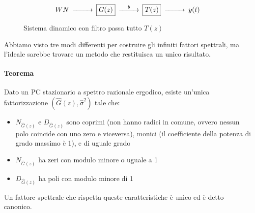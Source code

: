  \begin{figure}[htbp]\Large
  \centering
  \[
    \begin{CD}
        WN @>>> \framebox{$G(z)$} @>y>> \framebox{$T(z)$} @>>> y(t)
    \end{CD}
  \]
  \caption{Sistema dinamico con filtro passa tutto $T(z)$ \label{fig:spettcan3}}
\end{figure}
  
Abbiamo visto tre modi differenti per costruire gli infiniti fattori spettrali, ma l'ideale sarebbe trovare un metodo che restituisca un unico risultato.
\paragraph{Teorema} Dato un PC stazionario a spettro razionale ergodico, esiste un'unica fattorizzazione $(\hat{G}(z),\hat{\sigma}^2)$ tale che:
\begin{itemize}
  \item $N_{\hat{G}(z)}$ e $D_{\hat{G}(z)}$ sono coprimi (non hanno radici in comune, ovvero nessun polo coincide con uno zero e viceversa), monici (il coefficiente della potenza di grado massimo è 1), e di uguale grado
  \item $N_{\hat{G}(z)}$ ha zeri con modulo minore o uguale a 1
  \item $D_{\hat{G}(z)}$ ha poli con modulo minore di 1
\end{itemize}
Un fattore spettrale che rispetta queste caratteristiche è unico ed è detto canonico.

